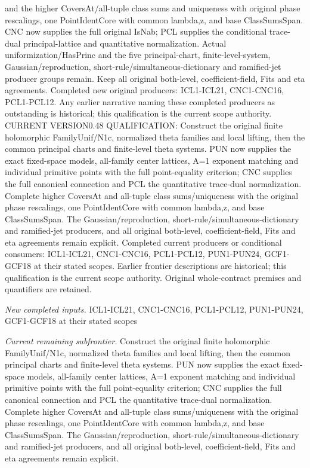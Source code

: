 and the higher CoversAt/all-tuple class sums and uniqueness with original phase rescalings, one PointIdentCore with common lambda,z, and base ClassSumsSpan. CNC now supplies the full original IsNab; PCL supplies the conditional trace-dual principal-lattice and quantitative normalization. Actual uniformization/HasPrinc and the five principal-chart, finite-level-system, Gaussian/reproduction, short-rule/simultaneous-dictionary and ramified-jet producer groups remain. Keep all original both-level, coefficient-field, Fits and eta agreements. Completed new original producers: ICL1-ICL21, CNC1-CNC16, PCL1-PCL12. Any earlier narrative naming these completed producers as outstanding is historical; this qualification is the current scope authority. CURRENT VERSION0.48 QUALIFICATION: Construct the original finite holomorphic FamilyUnif/N1c, normalized theta families and local lifting, then the common principal charts and finite-level theta systems. PUN now supplies the exact fixed-space models, all-family center lattices, A=1 exponent matching and individual primitive points with the full point-equality criterion; CNC supplies the full canonical connection and PCL the quantitative trace-dual normalization. Complete higher CoversAt and all-tuple class sums/uniqueness with the original phase rescalings, one PointIdentCore with common lambda,z, and base ClassSumsSpan. The Gaussian/reproduction, short-rule/simultaneous-dictionary and ramified-jet producers, and all original both-level, coefficient-field, Fits and eta agreements remain explicit. Completed current producers or conditional consumers: ICL1-ICL21, CNC1-CNC16, PCL1-PCL12, PUN1-PUN24, GCF1-GCF18 at their stated scopes. Earlier frontier descriptions are historical; this qualification is the current scope authority. Original whole-contract premises and quantifiers are retained.

\emph{New completed inputs.} ICL1-ICL21, CNC1-CNC16, PCL1-PCL12, PUN1-PUN24, GCF1-GCF18 at their stated scopes

\emph{Current remaining subfrontier.} Construct the original finite holomorphic FamilyUnif/N1c, normalized theta families and local lifting, then the common principal charts and finite-level theta systems. PUN now supplies the exact fixed-space models, all-family center lattices, A=1 exponent matching and individual primitive points with the full point-equality criterion; CNC supplies the full canonical connection and PCL the quantitative trace-dual normalization. Complete higher CoversAt and all-tuple class sums/uniqueness with the original phase rescalings, one PointIdentCore with common lambda,z, and base ClassSumsSpan. The Gaussian/reproduction, short-rule/simultaneous-dictionary and ramified-jet producers, and all original both-level, coefficient-field, Fits and eta agreements remain explicit.



